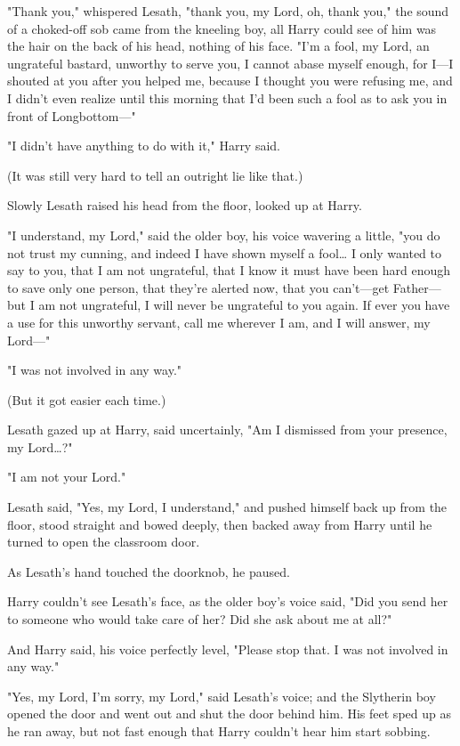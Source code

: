 "Thank you," whispered Lesath, "thank you, my Lord, oh, thank you," the sound 
of a choked-off sob came from the kneeling boy, all Harry could see of him was 
the hair on the back of his head, nothing of his face. "I'm a fool, my Lord, an 
ungrateful bastard, unworthy to serve you, I cannot abase myself enough, for 
I---I shouted at you after you helped me, because I thought you were refusing 
me, and I didn't even realize until this morning that I'd been such a fool as 
to ask you in front of Longbottom---"

"I didn't have anything to do with it," Harry said.

(It was still very hard to tell an outright lie like that.)

Slowly Lesath raised his head from the floor, looked up at Harry.

"I understand, my Lord," said the older boy, his voice wavering a little, "you 
do not trust my cunning, and indeed I have shown myself a fool{\ldots} I only 
wanted to say to you, that I am not ungrateful, that I know it must have been 
hard enough to save only one person, that they're alerted now, that you 
can't---get Father---but I am not ungrateful, I will never be ungrateful to you 
again. If ever you have a use for this unworthy servant, call me wherever I am, 
and I will answer, my Lord---"

"I was not involved in any way."

(But it got easier each time.)

Lesath gazed up at Harry, said uncertainly, "Am I dismissed from your presence, 
my Lord{\ldots}?"

"I am not your Lord."

Lesath said, "Yes, my Lord, I understand," and pushed himself back up from the 
floor, stood straight and bowed deeply, then backed away from Harry until he 
turned to open the classroom door.

As Lesath's hand touched the doorknob, he paused.

Harry couldn't see Lesath's face, as the older boy's voice said, "Did you send 
her to someone who would take care of her? Did she ask about me at all?"

And Harry said, his voice perfectly level, "Please stop that. I was not 
involved in any way."

"Yes, my Lord, I'm sorry, my Lord," said Lesath's voice; and the Slytherin boy 
opened the door and went out and shut the door behind him. His feet sped up as 
he ran away, but not fast enough that Harry couldn't hear him start sobbing.

